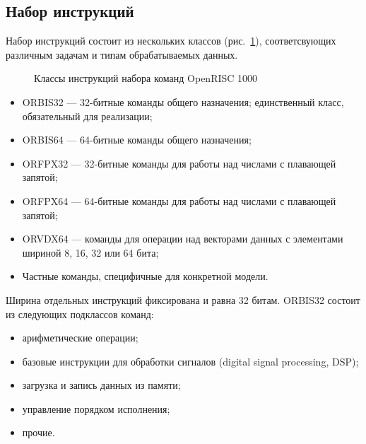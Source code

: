 \subsection{Набор инструкций}

Набор инструкций состоит из нескольких классов (рис.~\ref{fig:or1k-isa}), соответсвующих различным задачам и типам обрабатываемых данных.

\begin{figure}[htbp]
\centering
{}
\caption{Классы инструкций набора команд OpenRISC 1000}\label{fig:or1k-isa}
\end{figure}

\begin{itemize}
    \item ORBIS32 --- 32-битные команды общего назначения; единственный класс, обязательный для реализации;
    \item ORBIS64 --- 64-битные команды общего назначения;
    \item ORFPX32 --- 32-битные команды для работы над числами с плавающей запятой;
    \item ORFPX64 --- 64-битные команды для работы над числами с плавающей запятой;
    \item ORVDX64 --- команды для операции над векторами данных с элементами шириной 8, 16, 32 или 64 бита;
    \item Частные команды, специфичные для конкретной модели.
\end{itemize}

Ширина отдельных инструкций фиксирована и равна 32 битам. ORBIS32 состоит из следующих подклассов команд:

\begin{itemize}
    \item арифметические операции;
    \item базовые инструкции для обработки сигналов (\abbr digital signal processing, DSP);
    \item загрузка и запись данных из памяти;
    \item управление порядком исполнения;
    \item прочие.
\end{itemize}

